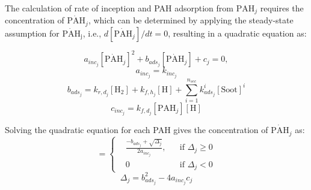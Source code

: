 The calculation of rate of inception and PAH adsorption from $\mathrm{PAH}_j$ requires the concentration of $\mathrm{\dot{PAH}}_j$, which can be determined by applying the steady-state assumption for $\mathrm{\dot{PAH}_j}$, i.e., $d[\mathrm{\dot{PAH}}_j]/dt=0$, resulting in a quadratic equation as:




\begin{equation}
	a_{inc_j}[\mathrm{\dot{PAH}}_j]^2+
	b_{ads_j}[\mathrm{\dot{PAH}}_j] + c_j = 0,
\end{equation}
\begin{equation}
	a_{inc_j}=k_{inc_j}
\end{equation}
\begin{equation}
	b_{ads_j}=k_{r,d_j}[\mathrm{H_2}]+k_{f,h_j}[\mathrm{H}]+\sum_{i=1}^{n_{sec}}k^i_{ads_j}[\mathrm{Soot}]^i
\end{equation}
\begin{equation}
	c_{inc_j}=k_{f,d_j}[\mathrm{PAH}_j][\mathrm{H}]
\end{equation}

Solving the quadratic equation for each PAH gives the concentration of $\mathrm{\mathrm{\dot{PAH}}}_j$ as:
\begin{equation}
	[\mathrm{\mathrm{\dot{PAH}}}_j]=
	\left\{
	\begin{aligned}
		&\frac{-b_{ads_j}+\sqrt{\Delta_j}}{2a_{inc_j}},
		&&
		\text{if } \Delta_j \ge 0
		\\
		& 0 
		&&
		\text{if } \Delta_j < 0
	\end{aligned}
	\right.
	\label{eqn:rad_ebri}
\end{equation}
\begin{equation}
	\Delta_j = b_{ads_j}^2-4a_{inc_j}c_{j}
	\label{eqn:delta_ebri}
\end{equation}

